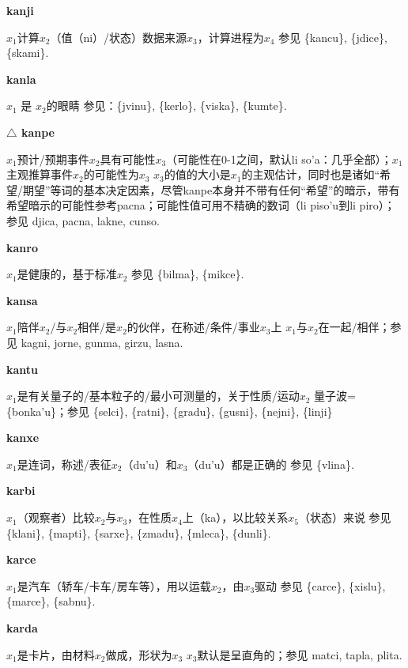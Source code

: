 \documentclass[notitlepage,twocolumn,a4paper,10pt]{book}
\begin{document}
{\sffamily\bfseries kanji}\enspace {\ttfamily\bfseries[kaj]}  $x_1$计算$x_2$（值（ni）\slash{}状态）数据来源$x_3$，计算进程为$x_4$ \textemdash{} 参见 \{kancu\}, \{jdice\}, \{skami\}.

{\sffamily\bfseries kanla}\enspace {\ttfamily\bfseries[kal]}  $x_{1}$ 是 $x_{2}$的眼睛 \textemdash{} 参见：\{jvinu\}, \{kerlo\}, \{viska\}, \{kumte\}.

{\sffamily\bfseries $\triangle$ kanpe} $x_1$预计\slash{}预期事件$x_2$具有可能性$x_3$（可能性在0-1之间，默认{li} {so'a}：几乎全部）；$x_1$主观推算事件$x_2$的可能性为$x_3$ \textemdash{} $x_3$的值的大小是$x_1$的主观估计，同时也是诸如“希望\slash{}期望”等词的基本决定因素，尽管kanpe本身并不带有任何“希望”的暗示，带有希望暗示的可能性参考{pacna}；可能性值可用不精确的数词（{li} {piso'u}到{li} {piro}）；参见 {djica}, {pacna}, {lakne}, {cunso}.

{\sffamily\bfseries kanro}\enspace {\ttfamily\bfseries[        ka'o]}  $x_1$是健康的，基于标准$x_2$ \textemdash{} 参见 \{bilma\}, \{mikce\}.

{\sffamily\bfseries kansa}\enspace {\ttfamily\bfseries[kan]}  $x_1$陪伴$x_2$\slash{}与$x_2$相伴\slash{}是$x_2$的伙伴，在称述\slash{}条件\slash{}事业$x_3$上 \textemdash{} $x_1$与$x_2$在一起\slash{}相伴；参见 {kagni}, {jorne}, {gunma}, {girzu}, {lasna}.

{\sffamily\bfseries kantu}\enspace {\ttfamily\bfseries[        ka'u]}  $x_1$是有关量子的\slash{}基本粒子的\slash{}最小可测量的，关于性质\slash{}运动$x_2$ \textemdash{} 量子波= \{bonka'u\}；参见 \{selci\}, \{ratni\}, \{gradu\}, \{gusni\}, \{nejni\}, \{linji\}

{\sffamily\bfseries kanxe}\enspace {\ttfamily\bfseries[kax]}  $x_1$是连词，称述\slash{}表征$x_2$（du'u）和$x_3$（du'u）都是正确的 \textemdash{} 参见 \{vlina\}.

{\sffamily\bfseries karbi}\enspace {\ttfamily\bfseries[kab]}  $x_1$（观察者）比较$x_2$与$x_3$，在性质$x_4$上（ka），以比较关系$x_5$（状态）来说 \textemdash{} 参见 \{klani\}, \{mapti\}, \{sarxe\}, \{zmadu\}, \{mleca\}, \{dunli\}.

{\sffamily\bfseries karce} $x_1$是汽车（轿车\slash{}卡车\slash{}房车等），用以运载$x_2$，由$x_3$驱动 \textemdash{} 参见 \{carce\}, \{xislu\}, \{marce\}, \{sabnu\}.

{\sffamily\bfseries karda} $x_1$是卡片，由材料$x_2$做成，形状为$x_3$ \textemdash{} $x_3$默认是呈直角的；参见 {matci}, {tapla}, {plita}.
\end{document}
